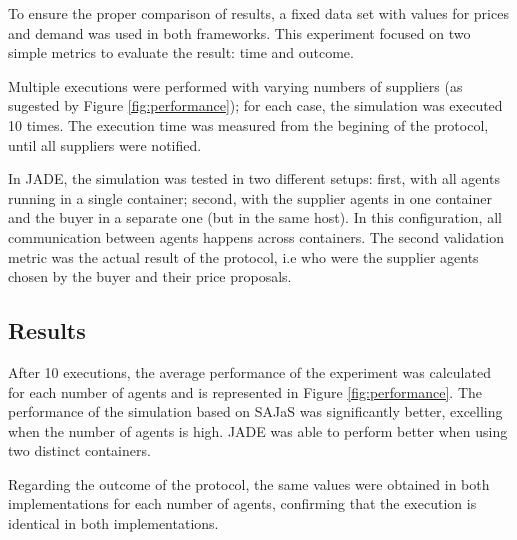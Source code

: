 To ensure the proper comparison of results, a fixed data set with values for prices and demand was used in both frameworks. This experiment focused on two simple metrics to evaluate the result: time and outcome. 

Multiple executions were performed with varying numbers of suppliers (as sugested by Figure \ref{fig:performance}); for each case, the simulation was executed 10 times. The execution time was measured from the begining of the protocol, until all suppliers were notified.

In JADE, the simulation was tested in two different setups: first, with all agents running in a single container; second, with the supplier agents in one container and the buyer in a separate one (but in the same host). In this configuration, all communication between agents happens across containers. The second validation metric was the actual result of the protocol, i.e who were the supplier agents chosen by the buyer and their price proposals.

\subsection{Results}

After 10 executions, the average performance of the experiment was calculated for each number of agents and is represented in Figure \ref{fig:performance}. The performance of the simulation based on SAJaS was significantly better, excelling when the number of agents is high. JADE was able to perform better when using two distinct containers.

Regarding the outcome of the protocol, the same values were obtained in both implementations for each number of agents, confirming that the execution is identical in both implementations.

